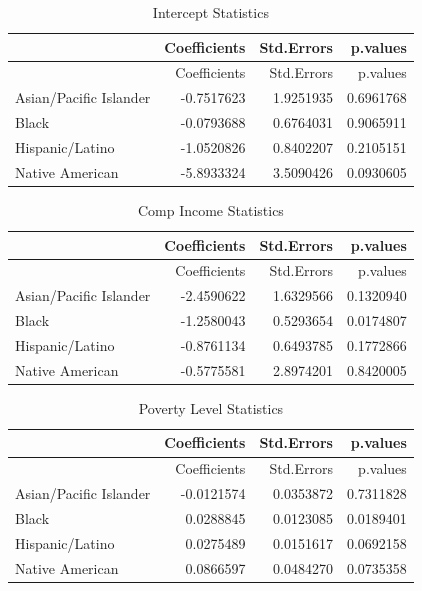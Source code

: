 \documentclass[
  letterpaper,
  DIV=11,
  numbers=noendperiod]{scrartcl}
\begin{document}
\begin{longtable}[]{@{}lrrr@{}}
\caption{Intercept Statistics}\tabularnewline
\toprule\noalign{}
& Coefficients & Std.Errors & p.values \\
\midrule\noalign{}
\endfirsthead
\toprule\noalign{}
& Coefficients & Std.Errors & p.values \\
\midrule\noalign{}
\endhead
\bottomrule\noalign{}
\endlastfoot
Asian/Pacific Islander & -0.7517623 & 1.9251935 & 0.6961768 \\
Black & -0.0793688 & 0.6764031 & 0.9065911 \\
Hispanic/Latino & -1.0520826 & 0.8402207 & 0.2105151 \\
Native American & -5.8933324 & 3.5090426 & 0.0930605 \\
\end{longtable}

\begin{longtable}[]{@{}lrrr@{}}
\caption{Comp Income Statistics}\tabularnewline
\toprule\noalign{}
& Coefficients & Std.Errors & p.values \\
\midrule\noalign{}
\endfirsthead
\toprule\noalign{}
& Coefficients & Std.Errors & p.values \\
\midrule\noalign{}
\endhead
\bottomrule\noalign{}
\endlastfoot
Asian/Pacific Islander & -2.4590622 & 1.6329566 & 0.1320940 \\
Black & -1.2580043 & 0.5293654 & 0.0174807 \\
Hispanic/Latino & -0.8761134 & 0.6493785 & 0.1772866 \\
Native American & -0.5775581 & 2.8974201 & 0.8420005 \\
\end{longtable}

\begin{longtable}[]{@{}lrrr@{}}
\caption{Poverty Level Statistics}\tabularnewline
\toprule\noalign{}
& Coefficients & Std.Errors & p.values \\
\midrule\noalign{}
\endfirsthead
\toprule\noalign{}
& Coefficients & Std.Errors & p.values \\
\midrule\noalign{}
\endhead
\bottomrule\noalign{}
\endlastfoot
Asian/Pacific Islander & -0.0121574 & 0.0353872 & 0.7311828 \\
Black & 0.0288845 & 0.0123085 & 0.0189401 \\
Hispanic/Latino & 0.0275489 & 0.0151617 & 0.0692158 \\
Native American & 0.0866597 & 0.0484270 & 0.0735358 \\
\end{longtable}
\end{document}
